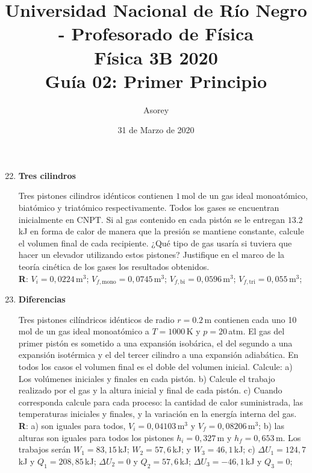 \documentclass[a4paper,12pt]{article}
\begin{document}
\title{
{\normalsize{Universidad Nacional de Río Negro - Profesorado de Física}}\\
Física 3B 2020 \\ Guía 02: Primer Principio
}
\author{Asorey}
\date{31 de Marzo de 2020}
\maketitle

\begin{enumerate}
	\setcounter{enumi}{21}      %

    \item {\bf{Tres cilindros}}

        Tres pistones cilindros idénticos contienen $1$\,mol de un gas ideal 
        monoatómico, biatómico y triatómico respectivamente. Todos los gases se
        encuentran inicialmente en CNPT. Si al gas contenido en cada pistón se
        le entregan $13.2$\,kJ en forma de calor de manera que la presión se
        mantiene constante, calcule el volumen final de cada recipiente.
        ¿Qué tipo de gas usaría si tuviera que hacer un elevador utilizando 
        estos pistones? Justifique en el marco de la teoría cinética de los
        gases los resultados obtenidos.
		\\{\bf{R}}: $V_i=0,0224$\,m$^3$; $V_{f,\mathrm{mono}}=0,0745$\,m$^3$;
		$V_{f,\mathrm{bi}}=0,0596$\,m$^3$; $V_{f,\mathrm{tri}}=0,055$\,m$^3$;

	\item {\bf{Diferencias}}
		
		Tres pistones cilíndricos idénticos de radio $r=0.2$\,m contienen cada
		uno 10\,mol de un gas ideal monoatómico a $T=1000$\,K y $p=20$\,atm.
		El gas del primer pistón es sometido a una expansión isobárica, el del
		segundo a una expansión isotérmica y el del tercer cilindro a una
		expansión adiabática. En todos los casos el volumen final es el doble
		del volumen inicial. Calcule: a) Los volúmenes iniciales y finales en
		cada pistón. b) Calcule el trabajo realizado por el gas y la altura
		inicial y final de cada pistón. c) Cuando corresponda calcule para cada
		proceso: la cantidad de calor suministrada, las temperaturas iniciales
		y finales, y la variación en la energía interna del gas.
		\\{\bf{R}}: a) son iguales para todos, $V_i=0,04103$\,m$^3$ y
		$V_{f}=0,08206$\,m$^3$; b) las alturas son iguales para todos los
		pistones $h_i=0,327$\,m y $h_f=0,653$\,m. Los trabajos serán
		$W_1=83,15$\,kJ; $W_2=57,6$\,kJ; y $W_3=46,1$\,kJ; c) $\Delta
		U_1=124,7$\,kJ y $Q_1=208,85$\,kJ; $\Delta U_2=0$ y $Q_2=57,6$\,kJ;
		$\Delta U_3=-46,1$\,kJ y $Q_3=0$;  
	

\end{enumerate}
\end{document}
